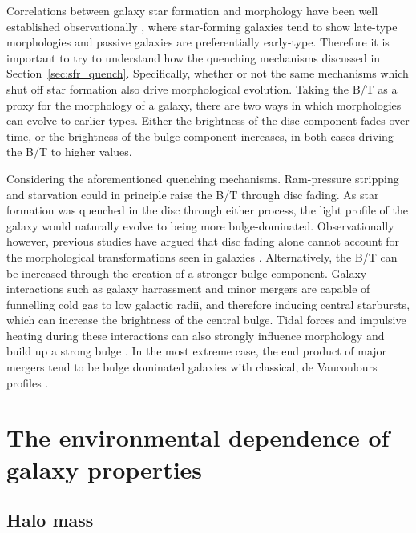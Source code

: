 Correlations between galaxy star formation and morphology have been
well established observationally \citep[e.g.][]{schawinski2014}, where
star-forming
galaxies tend to show late-type morphologies and passive galaxies are
preferentially early-type.  Therefore it is important to try to
understand how the quenching mechanisms discussed in
Section~\ref{sec:sfr_quench}.  Specifically, whether or not the same
mechanisms which shut off star formation also drive morphological
evolution.  Taking the B/T as a proxy for the morphology of a galaxy,
there are two ways in which morphologies can evolve to earlier types.
Either the brightness of the disc component fades over time, or the brightness
of the bulge component increases, in both cases driving the B/T to
higher values.
\par
Considering the aforementioned quenching mechanisms.  Ram-pressure
stripping and starvation could in principle raise the B/T through disc
fading.  As star formation was quenched in the disc through either
process, the light profile of the galaxy would naturally evolve to
being more bulge-dominated.  Observationally however, previous studies
have argued that disc fading alone cannot account for the
morphological transformations seen in galaxies \citep{christlein2004,
  bundy2010}.  Alternatively, the B/T can be increased through the
creation of a stronger bulge component.  Galaxy interactions such as galaxy
harrassment and minor mergers are capable of funnelling cold gas to
low galactic radii, and therefore inducing central starbursts, which
can increase the brightness of the
central bulge.  Tidal forces and impulsive heating during these interactions can also
strongly influence morphology and build up a strong bulge
\citep{moore1996, bekki2011}.  In the most extreme
case, the end product
of major mergers tend to be bulge dominated galaxies with classical,
de Vaucoulours profiles \citep[e.g.][]{barnes1989}.

\section{The environmental dependence of galaxy properties}
\label{sec:enviro_dependence}

\subsection{Halo mass}
\label{sec:halo_mass}

